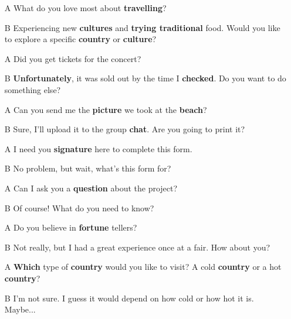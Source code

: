 \begin{itemize}
  \item[A] What do you love most about \textbf{travelling}?
  \item[B] Experiencing new \textbf{cultures} and \textbf{trying traditional} food. Would you like to explore a specific \textbf{country} or \textbf{culture}?  
\end{itemize}

\begin{itemize}
  \item[A] Did you get tickets for the concert?
  \item[B] \textbf{Unfortunately}, it was sold out by the time I \textbf{checked}. Do you want to do something else?
\end{itemize}

\begin{itemize}
  \item[A] Can you send me the \textbf{picture} we took at the \textbf{beach}?
  \item[B] Sure, I'll upload it to the group \textbf{chat}. Are you going to print it?
\end{itemize}

\begin{itemize}
  \item[A] I need you \textbf{signature} here to complete this form.
  \item[B] No problem, but wait, what's this form for? 
\end{itemize}

\begin{itemize}
  \item[A] Can I ask you a \textbf{question} about the project?
  \item[B] Of course! What do you need to know? 
\end{itemize}

\begin{itemize}
  \item[A] Do you believe in \textbf{fortune} tellers?
  \item[B] Not really, but I had a great experience once at a fair. How about you? 
\end{itemize}

\begin{itemize}
  \item[A] \textbf{Which} type of \textbf{country} would you like to visit? A cold \textbf{country} or a hot \textbf{country}?
  \item[B] I'm not sure. I guess it would depend on how cold or how hot it is. Maybe...
\end{itemize}

